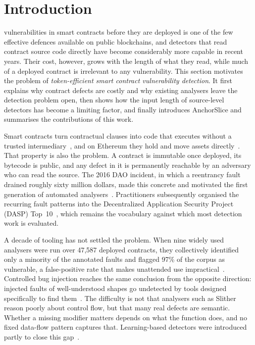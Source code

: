 \documentclass{ieeeaccess}
\begin{document}
\titlepgskip=-21pt

\maketitle

\section{Introduction}\label{sec:introduction}
 vulnerabilities in smart contracts before they are deployed is one of the few effective defences available on public blockchains, and detectors that read contract source code directly have become considerably more capable in recent years. Their cost, however, grows with the length of what they read, while much of a deployed contract is irrelevant to any vulnerability. This section motivates the problem of \emph{token-efficient smart contract vulnerability detection}. It first explains why contract defects are costly and why existing analysers leave the detection problem open, then shows how the input length of source-level detectors has become a limiting factor, and finally introduces AnchorSlice and summarises the contributions of this work.

Smart contracts turn contractual clauses into code that executes without a trusted intermediary~\cite{szabo1997}, and on Ethereum they hold and move assets directly~\cite{wood2014}. That property is also the problem. A contract is immutable once deployed, its bytecode is public, and any defect in it is permanently reachable by an adversary who can read the source. The 2016 DAO incident, in which a reentrancy fault drained roughly sixty million dollars, made this concrete and motivated the first generation of automated analysers~\cite{luu2016}. Practitioners subsequently organised the recurring fault patterns into the Decentralized Application Security Project (DASP) Top~10~\cite{dasp}, which remains the vocabulary against which most detection work is evaluated.

A decade of tooling has not settled the problem. When nine widely used analysers were run over 47,587 deployed contracts, they collectively identified only a minority of the annotated faults and flagged 97\% of the corpus as vulnerable, a false-positive rate that makes unattended use impractical~\cite{durieux2020}. Controlled bug injection reaches the same conclusion from the opposite direction: injected faults of well-understood shapes go undetected by tools designed specifically to find them~\cite{ghaleb2020}. The difficulty is not that analysers such as Slither~\cite{feist2019} reason poorly about control flow, but that many real defects are semantic. Whether a missing modifier matters depends on what the function does, and no fixed data-flow pattern captures that. Learning-based detectors were introduced partly to close this gap~\cite{zhuang2020}.
\end{document}
